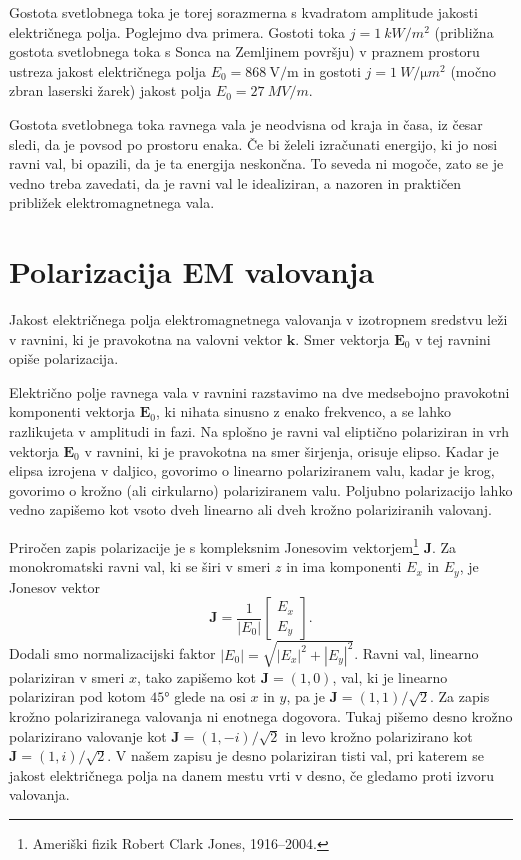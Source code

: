 Gostota svetlobnega toka je torej sorazmerna
s kvadratom amplitude jakosti električnega polja. Poglejmo dva primera.
Gostoti toka $j=1~\si{kW/m^{2}}$
(približna gostota svetlobnega toka s Sonca na Zemljinem površju) v praznem prostoru ustreza 
jakost električnega polja $E_{0}=868~\si{\volt/\meter}$ in gostoti $j=1~\si{W/\micro m^{2}}$ 
(močno zbran laserski žarek) jakost polja $E_{0}=27~\si{MV/m}$. 

Gostota svetlobnega toka ravnega vala je neodvisna od kraja in časa, iz česar sledi,
da je povsod po prostoru enaka. Če bi želeli izračunati energijo,
ki jo nosi ravni val, bi opazili, da je ta energija neskončna. To
seveda ni mogoče, zato se je vedno treba zavedati, da je ravni val
le idealiziran, a nazoren in praktičen približek elektromagnetnega
vala.

\section{Polarizacija EM valovanja}
Jakost električnega polja elektromagnetnega valovanja v izotropnem
sredstvu leži v ravnini, ki je pravokotna na valovni vektor $\mathbf{k}$. 
Smer vektorja $\mathbf{E}_0$ v tej ravnini opiše
polarizacija. 

Električno polje ravnega vala v ravnini razstavimo na dve medsebojno 
pravokotni komponenti vektorja $\mathbf{E}_0$, ki
nihata sinusno z enako frekvenco, a se lahko razlikujeta v amplitudi in fazi. 
Na splošno je ravni val eliptično polariziran in
vrh vektorja $\mathbf E_0$ v ravnini, ki je pravokotna 
na smer širjenja, orisuje elipso. Kadar je elipsa izrojena v daljico,
govorimo o linearno polariziranem valu,
kadar je krog, govorimo o krožno (ali cirkularno) polariziranem valu. 
Poljubno polarizacijo lahko vedno zapišemo kot vsoto dveh linearno ali dveh 
krožno polariziranih valovanj. 

Priročen zapis polarizacije je s kompleksnim Jonesovim 
vektorjem\footnote{Ameriški fizik Robert Clark Jones, 1916--2004.}
$\mathbf{J}$. Za monokromatski ravni val, ki se širi v smeri $z$ in ima 
komponenti $E_x$ in $E_y$, je Jonesov vektor
\begin{equation}
\mathbf{J}=\frac{1}{|E_{0}|}\left[\begin{array}{c}
E_{x}\\
E_{y}
\end{array}\right].
\end{equation}
Dodali smo normalizacijski faktor $|E_{0}|=\sqrt{|E_{x}|^{2}+|E_{y}|^{2}}$.
Ravni val, linearno polariziran v smeri $x$, tako zapišemo kot $\mathbf{J}=\left(1,0\right)$,
val, ki je linearno polariziran pod kotom $\ang{45}$ glede na osi
$x$ in $y$, pa je $\mathbf{J}=\left(1,1\right)/\sqrt{2}$.
Za zapis krožno polariziranega valovanja ni enotnega dogovora. Tukaj pišemo
desno krožno polarizirano valovanje kot 
$\mathbf{J}=\left(1,-i\right)/\sqrt{2}$ in
levo krožno polarizirano kot $\mathbf{J}=\left(1,i\right)/\sqrt{2}$.
V našem zapisu je desno polariziran tisti val, pri katerem se jakost električnega
polja na danem mestu vrti v desno, če gledamo proti izvoru valovanja. 

